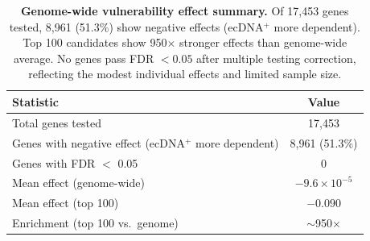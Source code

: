 \documentclass{article}
\begin{document}
\begin{table}[h]
\caption{\textbf{Genome-wide vulnerability effect summary.} Of 17,453 genes tested, 8,961 (51.3\%) show negative effects (ecDNA$^+$ more dependent). Top 100 candidates show 950$\times$ stronger effects than genome-wide average. No genes pass FDR $<0.05$ after multiple testing correction, reflecting the modest individual effects and limited sample size.}
\label{tab:genomewide}
\centering
\small
\begin{tabular}{@{}lc@{}}
\toprule
Statistic & Value \\
\midrule
Total genes tested & 17,453 \\
Genes with negative effect (ecDNA$^+$ more dependent) & 8,961 (51.3\%) \\
Genes with FDR $<$ 0.05 & 0 \\
Mean effect (genome-wide) & $-9.6 \times 10^{-5}$ \\
Mean effect (top 100) & $-0.090$ \\
Enrichment (top 100 vs.\ genome) & $\sim$950$\times$ \\
\bottomrule
\end{tabular}
\end{table}
\end{document}

